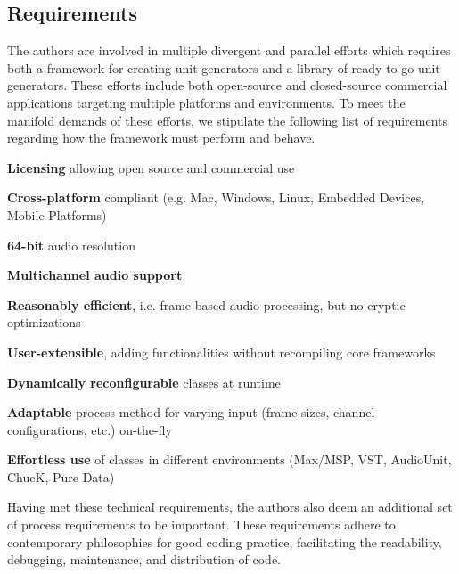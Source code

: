 \documentclass[twoside,10pt]{article}
\newenvironment{packed_item}{
\begin{itemize}
  \setlength{\itemsep}{1pt}
  \setlength{\parskip}{0pt}
  \setlength{\parsep}{0pt}
}{\end{itemize}}
\begin{document}
\subsection{Requirements} \label{sec:Requirements}%

The authors are involved in multiple divergent and parallel efforts which requires both a framework for creating unit generators and a library of ready-to-go unit generators.  These efforts include both open-source and closed-source commercial applications targeting multiple platforms and environments.  To meet the manifold demands of these efforts, we stipulate the following list of requirements regarding how the framework must perform and behave.

\begin{packed_item}%
  \item \textbf{Licensing} allowing open source and commercial use
	\item \textbf{Cross-platform} compliant (e.g. Mac, Windows, Linux, Embedded Devices, Mobile Platforms)	
	\item \textbf{64-bit} audio resolution
	\item \textbf{Multichannel audio support}
	\item \textbf{Reasonably efficient}, i.e. frame-based audio processing, but no cryptic optimizations
	\item \textbf{User-extensible}, adding functionalities without recompiling core frameworks
	\item \textbf{Dynamically reconfigurable} classes at runtime %
	\item \textbf{Adaptable} process method for varying input (frame sizes, channel configurations, etc.) on-the-fly
	\item \textbf{Effortless use} of classes in different environments (Max/MSP, VST, AudioUnit, ChucK, Pure Data)
\end{packed_item}%

\noindent Having met these technical requirements, the authors also deem an additional set of process requirements to be important.  These requirements adhere to contemporary philosophies for good coding practice, facilitating the readability, debugging, maintenance, and distribution of code. 
\end{document}
